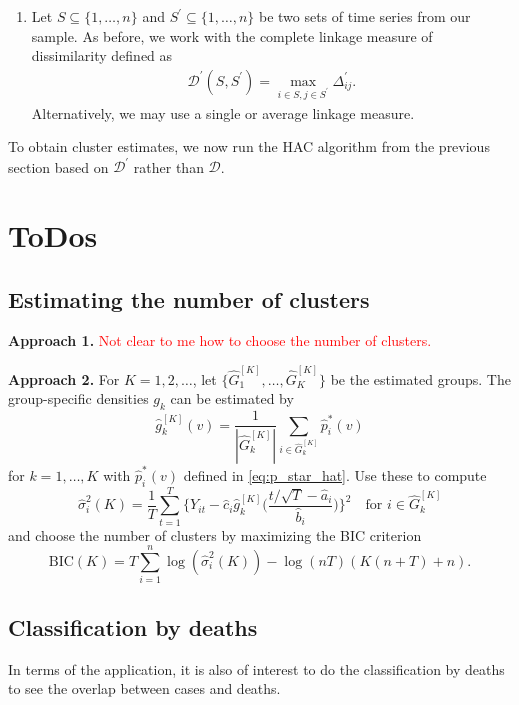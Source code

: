 \documentclass[a4paper,12pt]{article}
\numberwithin{equation}{section}
\begin{document}
\begin{enumerate}[label=\textit{Step \arabic*.},leftmargin=1.45cm]
\item Let $S \subseteq \{1, \ldots, n\}$ and $S^\prime \subseteq \{1, \ldots, n\}$ be two sets of time series from our sample. As before, we work with the complete linkage measure of dissimilarity defined as 
\begin{align*}
\mathcal{D}^\prime (S, S^\prime) = \max_{i \in S, j\in S^\prime} \Delta^\prime_{ij}.
\end{align*}
Alternatively, we may use a single or average linkage measure. 


\end{enumerate}
To obtain cluster estimates, we now run the HAC algorithm from the previous section based on $\mathcal{D}^\prime$ rather than $\mathcal{D}$. 



\section{ToDos}


\subsection{Estimating the number of clusters}

\textbf{Approach 1.} \textcolor{red}{Not clear to me how to choose the number of clusters.} 
\medskip 

\noindent \textbf{Approach 2.} For $K=1,2,\ldots$, let $\{\hat{G}_1^{[K]},\ldots,\hat{G}_K^{[K]}\}$ be the estimated groups. The group-specific densities $g_k$ can be estimated by 
\[ \hat{g}_k^{[K]}(v) = \frac{1}{|\hat{G}_k^{[K]}|} \sum\limits_{i \in \hat{G}_k^{[K]}} \hat{p}_i^*(v) \]
for $k=1,\ldots,K$ with $\hat{p}_i^*(v)$ defined in \eqref{eq:p_star_hat}. Use these to compute 
\[ \hat{\sigma}_i^2(K) = \frac{1}{T} \sum_{t=1}^T \Big\{ Y_{it} - \hat{c}_i \hat{g}_k^{[K]}\Big(\frac{t/\sqrt{T} - \hat{a}_i}{\hat{b}_i}\Big) \Big\}^2 \quad \text{for } i \in \hat{G}_k^{[K]} \]
and choose the number of clusters by maximizing the BIC criterion
\[ \text{BIC}(K) = T\sum_{i=1}^{n}\log (\hat{\sigma }_{i}^{2}(K))-\log (nT)\left(K(n+T)+n\right). \]


\subsection{Classification by deaths}

In terms of the application, it is also of interest to do the classification by deaths to see the overlap between cases and deaths.
\end{document}
